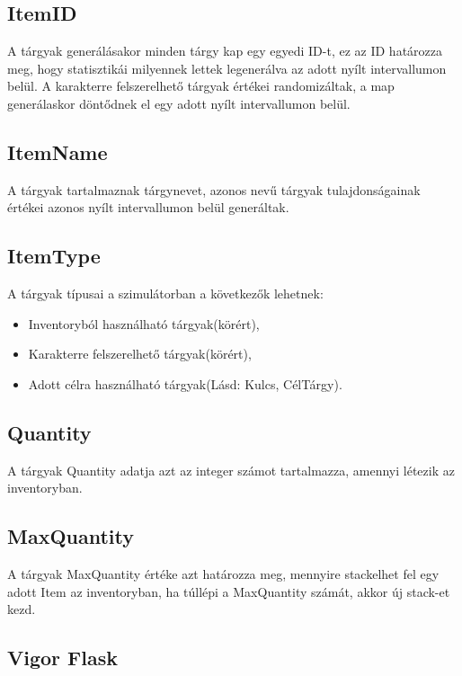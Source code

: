 \subsection{ItemID}

A tárgyak generálásakor minden tárgy kap egy egyedi ID-t, ez az ID határozza meg, hogy statisztikái milyennek lettek legenerálva az adott nyílt intervallumon belül.
A karakterre felszerelhető tárgyak értékei randomizáltak, a map generálaskor döntődnek el egy adott nyílt intervallumon belül.

\subsection{ItemName}

A tárgyak tartalmaznak tárgynevet, azonos nevű tárgyak tulajdonságainak értékei azonos nyílt intervallumon belül generáltak.

\subsection{ItemType}

A tárgyak típusai a szimulátorban a következők lehetnek:
\begin{itemize}
    \item Inventoryból használható tárgyak(körért),
    \item Karakterre felszerelhető tárgyak(körért),
    \item Adott célra használható tárgyak(Lásd: Kulcs, CélTárgy).
\end{itemize}

\subsection{Quantity}

A tárgyak Quantity adatja azt az integer számot tartalmazza, amennyi létezik az inventoryban.

\subsection{MaxQuantity}

A tárgyak MaxQuantity értéke azt határozza meg, mennyire stackelhet fel egy adott Item az inventoryban, ha túllépi a MaxQuantity számát, akkor új stack-et kezd.


\subsection{Vigor Flask}

